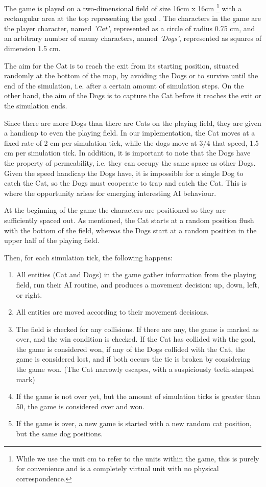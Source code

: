 The game is played on a two-dimensional field of size 16cm x 16cm
\footnote{While we use the unit cm to refer to the units within the game, this
  is purely for convenience and is a completely virtual unit with no physical
  correspondence.} with a rectangular area at the top representing the goal
. The characters in the game are the player
character, named \emph{'Cat'}, represented as a circle of radius 0.75 cm, and an
arbitrary number of enemy characters, named \emph{'Dogs'}, represented as
squares of dimension 1.5 cm.

The aim for the Cat is to reach the exit from its starting position, situated
randomly at the bottom of the map, by avoiding the Dogs or to survive until the
end of the simulation, i.e. after a certain amount of simulation steps. On the
other hand, the aim of the Dogs is to capture the Cat before it reaches the exit
or the simulation ends.

Since there are more Dogs than there are Cats on the playing field, they are
given a handicap to even the playing field. In our implementation, the Cat moves
at a fixed rate of 2 cm per simulation tick, while the dogs move at $3/4$ that
speed, 1.5 cm per simulation tick. In addition, it is important to note that
the Dogs have the property of permeability, i.e. they can occupy the same space
as other Dogs. Given the speed handicap the Dogs have, it is impossible for a
single Dog to catch the Cat, so the Dogs must cooperate to trap and catch the
Cat. This is where the opportunity arises for emerging interesting AI behaviour.

At the beginning of the game the characters are positioned so they are
sufficiently spaced out. As mentioned, the Cat starts at a random position flush
with the bottom of the field, whereas the Dogs start at a random position in the
upper half of the playing field.

Then, for each simulation tick, the following happens:

\begin{enumerate}
\item All entities (Cat and Dogs) in the game gather information from the
  playing field, run their AI routine, and produces a movement decision: up,
  down, left, or right.
\item All entities are moved according to their movement decisions.
\item The field is checked for any collisions. If there are any, the game is
  marked as over, and the win condition is checked. If the Cat has collided with
  the goal, the game is considered won, if any of the Dogs collided with the
  Cat, the game is considered lost, and if both occurs the tie is broken by
  considering the game won. (The Cat narrowly escapes, with a suspiciously
  teeth-shaped mark)
\item If the game is not over yet, but the amount of simulation ticks is greater
  than 50, the game is considered over and won.
\item If the game is over, a new game is started with a new random cat position,
  but the same dog positions. 
\end{enumerate}


